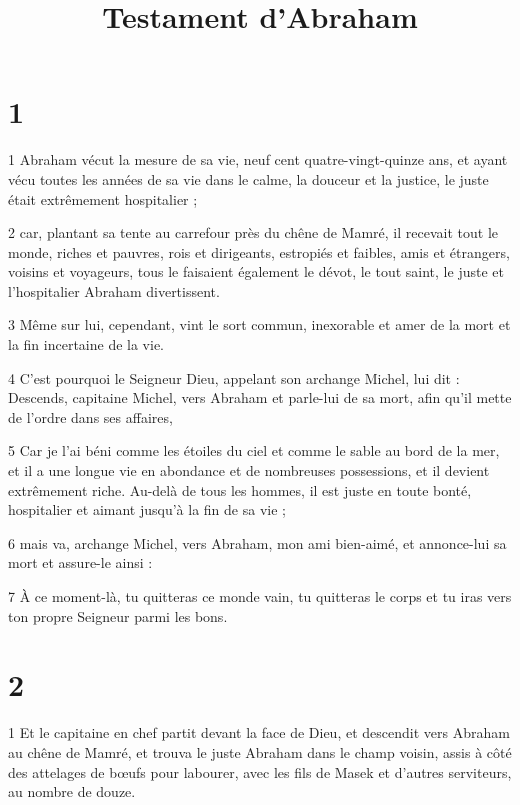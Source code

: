 

\title{Testament d'Abraham}


\chapter{1}

\par 1 Abraham vécut la mesure de sa vie, neuf cent quatre-vingt-quinze ans, et ayant vécu toutes les années de sa vie dans le calme, la douceur et la justice, le juste était extrêmement hospitalier ;

\par 2 car, plantant sa tente au carrefour près du chêne de Mamré, il recevait tout le monde, riches et pauvres, rois et dirigeants, estropiés et faibles, amis et étrangers, voisins et voyageurs, tous le faisaient également le dévot, le tout saint, le juste et l'hospitalier Abraham divertissent.

\par 3 Même sur lui, cependant, vint le sort commun, inexorable et amer de la mort et la fin incertaine de la vie.

\par 4 C'est pourquoi le Seigneur Dieu, appelant son archange Michel, lui dit : Descends, capitaine Michel, vers Abraham et parle-lui de sa mort, afin qu'il mette de l'ordre dans ses affaires,

\par 5 Car je l'ai béni comme les étoiles du ciel et comme le sable au bord de la mer, et il a une longue vie en abondance et de nombreuses possessions, et il devient extrêmement riche. Au-delà de tous les hommes, il est juste en toute bonté, hospitalier et aimant jusqu'à la fin de sa vie ;

\par 6 mais va, archange Michel, vers Abraham, mon ami bien-aimé, et annonce-lui sa mort et assure-le ainsi :

\par 7 À ce moment-là, tu quitteras ce monde vain, tu quitteras le corps et tu iras vers ton propre Seigneur parmi les bons.

\chapter{2}

\par 1 Et le capitaine en chef partit devant la face de Dieu, et descendit vers Abraham au chêne de Mamré, et trouva le juste Abraham dans le champ voisin, assis à côté des attelages de bœufs pour labourer, avec les fils de Masek et d'autres serviteurs, au nombre de douze.

